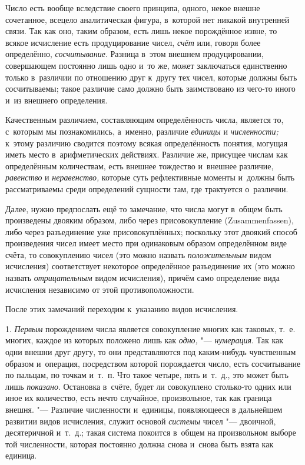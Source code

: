 Число есть вообще вследствие своего принципа, одного, некое внешне сочетанное,
всецело аналитическая фигура, в~которой нет никакой внутренней связи. Так как
оно, таким образом, есть лишь некое порождённое извне, то всякое исчисление
есть продуцирование чисел, {\em счёт} или, говоря более определённо,
{\em сосчитывание}. Разница в~этом внешнем продуцировании, совершающем
постоянно лишь одно и~то же, может заключаться единственно только в~различии по
отношению друг к~другу тех чисел, которые должны быть сосчитываемы; такое
различие само должно быть заимствовано из чего-то иного и~из внешнего
определения.

Качественным различием, составляющим определённость числа, является то,
с~которым мы познакомились, а~именно, различие {\em единицы} и {\em численности;}
к~этому различию сводится поэтому всякая определённость понятия, могущая иметь
место в~арифметических действиях. Различие же, присущее числам как определённым
количествам, есть внешнее тождество и~внешнее различие, {\em равенство} и
{\em неравенство,} которые суть рефлективные моменты и~должны быть
рассматриваемы среди определений сущности там, где трактуется о~различии.

Далее, нужно предпослать ещё то замечание, что числа могут в~общем быть
произведены двояким образом, либо через присовокупление
(Zu\-sam\-men\-fas\-sen), либо через разъединение уже присовокуплённых;
поскольку этот двоякий способ произведения чисел имеет место при одинаковым
образом определённом виде счёта, то совокуплению чисел (это можно назвать
{\em положительным} видом исчисления) соответствует некоторое определённое
разъединение их (это можно назвать {\em отрицательным} видом исчисления),
причём само определение вида исчисления независимо от этой противоположности.

После этих замечаний переходим к~указанию видов исчисления.

1. {\em Первым} порождением числа является совокупление многих как таковых, т.~е.
многих, каждое из которых положено лишь как {\em одно,} "--- {\em нумерация}.
Так как одни внешни друг другу, то они представляются под каким-нибудь
чувственным образом и~операция, посредством которой порождается число, есть
сосчитывание по пальцам, по точкам и~т.~п. Что такое четыре, пять и~т.~д., это
может быть лишь {\em показано}. Остановка в~счёте, будет ли совокуплено
столько-то одних или иное их количество, есть нечто случайное, произвольное,
так как граница внешня. "--- Различие численности и~единицы, появляющееся в
дальнейшем развитии видов исчисления, служит основой {\em системы} чисел "---
двоичной, десятеричной и~т.~д.; такая система покоится в~общем на произвольном
выборе той численности, которая постоянно должна снова и~снова быть взята как
единица.

